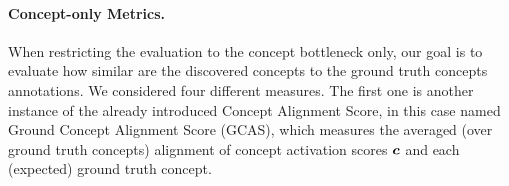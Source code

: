 
\paragraph{Concept-only Metrics.} When restricting the evaluation to the concept bottleneck only, our goal is to evaluate how similar are the discovered concepts to the ground truth concepts annotations. We considered four different measures. The first one is another instance of the already introduced {\small\sc Concept Alignment Score}, in this case named {\sc\small Ground Concept Alignment Score} ({\small\sc GCAS}), which measures the averaged (over ground truth concepts) alignment of concept activation scores ${\bm{c}}$ and each (expected) ground truth concept. 
%
